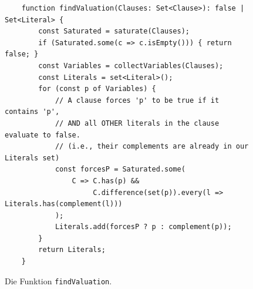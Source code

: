 \begin{figure}[!ht]
\centering
\begin{verbatim}
    function findValuation(Clauses: Set<Clause>): false | Set<Literal> {
        const Saturated = saturate(Clauses);
        if (Saturated.some(c => c.isEmpty())) { return false; }        
        const Variables = collectVariables(Clauses);
        const Literals = set<Literal>(); 
        for (const p of Variables) {
            // A clause forces 'p' to be true if it contains 'p', 
            // AND all OTHER literals in the clause evaluate to false.
            // (i.e., their complements are already in our Literals set)
            const forcesP = Saturated.some(
                C => C.has(p) && 
                     C.difference(set(p)).every(l => Literals.has(complement(l)))
            );
            Literals.add(forcesP ? p : complement(p));
        }    
        return Literals;
    }
\end{verbatim}
\vspace*{-0.3cm}
\caption{Die Funktion \texttt{findValuation}.}
\label{fig:Completeness.ipynb-3}
\end{figure}

\FloatBarrier


